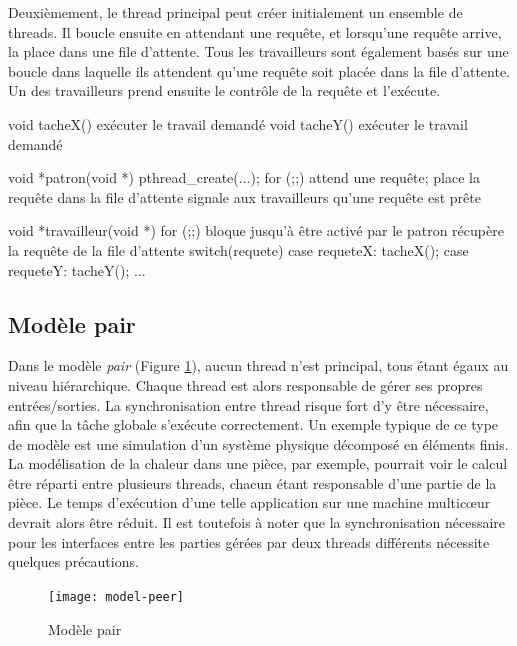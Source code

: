 Deuxièmement, le thread principal peut créer initialement un ensemble de threads. Il boucle ensuite en attendant une requête, et lorsqu'une requête arrive, la place dans une file d'attente. Tous les travailleurs sont également basés sur une boucle dans laquelle ils attendent qu'une requête soit placée dans la file d'attente. Un des travailleurs prend ensuite le contrôle de la requête et l'exécute.

\begin{codeblock}[list text={Exemple Travailleur},title={Un des travailleurs
prend le contrôle de la requête}]
void tacheX() { exécuter le travail demandé }
void tacheY() { exécuter le travail demandé }

void *patron(void *) {
  pthread_create(...);
  for (;;) {
    attend une requête;
    place la requête dans la file d'attente
    signale aux travailleurs qu'une requête est prête
  }
}

void *travailleur(void *) {
  for (;;) {
    bloque jusqu'à être activé par le patron
    récupère la requête de la file d'attente
    switch(requete){
      case requeteX: tacheX();
      case requeteY: tacheY();
      ...
    }
  }
}
\end{codeblock}

\subsection{Modèle pair}

Dans le modèle \emph{pair} (Figure \ref{fig:model-peer}), aucun thread n'est principal, tous étant égaux au niveau hiérarchique. Chaque thread est alors responsable de gérer ses propres entrées/sorties. La synchronisation entre thread risque fort d'y être nécessaire, afin que la tâche globale s'exécute correctement. Un exemple typique de ce type de modèle est une simulation d'un système physique décomposé en éléments finis. La modélisation de la chaleur dans une pièce, par exemple, pourrait voir le calcul être réparti entre plusieurs threads, chacun étant responsable d'une partie de la pièce. Le temps d'exécution d'une telle application sur une machine multicœur devrait alors être réduit. Il est toutefois à noter que la synchronisation nécessaire pour les interfaces entre les parties gérées par deux threads différents nécessite quelques précautions.


\begin{figure}[ht]
  \centering
  \texttt{[image: model-peer]}
  \caption{\label{fig:model-peer}Modèle pair}
\end{figure}


